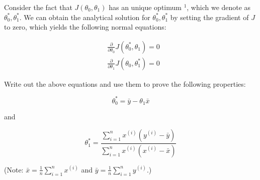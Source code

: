 \documentclass[10pt, a4paper]{article}
\begin{document}
\begin{Problem*}[(b)]
    Consider the fact that $J\left(\theta_{0}, \theta_{1}\right)$ has an unique optimum ${ }^{1}$, which we denote as $\theta_{0}^{*}, \theta_{1}^{*}$. We can obtain the analytical solution for $\theta_{0}^{*}, \theta_{1}^{*}$ by setting the gradient of $J$ to zero, which yields the following normal equations:


$$
\begin{aligned}
& \frac{\partial}{\partial \theta_{0}} J\left(\theta_{0}^{*}, \theta_{1}\right)=0 \\
& \frac{\partial}{\partial \theta_{1}} J\left(\theta_{0}, \theta_{1}^{*}\right)=0
\end{aligned}
$$

Write out the above equations and use them to prove the following properties:

$$
\theta_{0}^{*}=\bar{y}-\theta_{1} \bar{x}
$$

and

$$
\theta_{1}^{*}=\frac{\sum_{i=1}^{n} x^{(i)}\left(y^{(i)}-\bar{y}\right)}{\sum_{i=1}^{n} x^{(i)}\left(x^{(i)}-\bar{x}\right)}
$$

(Note: $\bar{x}=\frac{1}{n} \sum_{i=1}^{n} x^{(i)}$ and $\bar{y}=\frac{1}{n} \sum_{i=1}^{n} y^{(i)}$.)
\end{Problem*}
\end{document}
